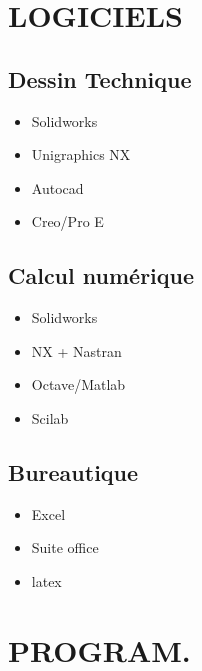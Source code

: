 \documentclass[10pt,a4paper,sans]{article}
\begin{document}
\begin{minipage}[t]{0.23\textwidth}
    \section{LOGICIELS}
    \subsection{Dessin Technique}
    \begin{itemize}
        \item{Solidworks}
        \item{Unigraphics NX}
        \item{Autocad}
        \item{Creo/Pro E}
    \end{itemize}

    \subsection{Calcul numérique}
        \begin{itemize}
            \item{Solidworks}
            \item{NX + Nastran}
            \item{Octave/Matlab}
            \item{Scilab}
        \end{itemize}
    \subsection{Bureautique}
        \begin{itemize}
            \item{Excel}
            \item{Suite office}
            \item{latex}
        \end{itemize}

    \section{PROGRAM.}

\end{minipage}
\end{document}
